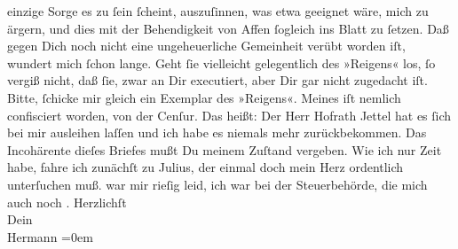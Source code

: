 \begin{ledgroupsized}[t]{13cm}
               einzige Sorge es zu ſein ſcheint, auszuſinnen, was etwa geeignet wäre, mich zu
               ärgern, und dies mit der Behendigkeit von Affen ſogleich ins Blatt zu ſetzen. Daß
               gegen Dich noch nicht eine ungeheuerliche Gemeinheit verübt worden iſt, wundert mich
               ſchon lange. Geht ſie vielleicht gelegentlich des »Reigens« los, ſo vergiß nicht, daß ſie, zwar an Dir executiert, aber Dir gar
               nicht zugedacht iſt.\pend
           \pstart
           Bitte, ſchicke mir gleich ein Exemplar des »Reigens«. Meines iſt nemlich confisciert {\pb}worden, von der Cenſur. Das heißt: Der Herr Hofrath Jettel hat es ſich bei mir ausleihen laſſen und ich habe es
               niemals mehr zurückbekommen.\pend
           \pstart
           Das Incohärente dieſes Briefes mußt Du meinem Zuſtand vergeben. Wie ich nur Zeit
               habe, fahre ich zunächſt zu Julius, der einmal
               doch mein Herz ordentlich unterſuchen muß.\pend
           \pstart
           \label{K_L01282_5v}\label{K_L01282_5h} war mir rieſig leid, ich war bei der Steuerbehörde, die mich auch noch
                  \label{K_L01282_6v}\label{K_L01282_6h}.\pend
           \pstart
           Herzlichſt{\\[\baselineskip]}Dein{\\[\baselineskip]}\spacefill\mbox{Hermann}\pend
           \leftskip=0em{}\endnumbering{}\end{ledgroupsized}  \newcommand{\dateiname}{L01282}\newcommand{\titel}{Hermann Bahr an Arthur Schnitzler, [29. 3. 1903?]}\newcommand{\editorInnen}{ Kurt Ifkovits,  Martin Anton Müller}
            \footnotesize
\begin{ledgroupsized}[t]{11.5cm}
\end{ledgroupsized}
         
      